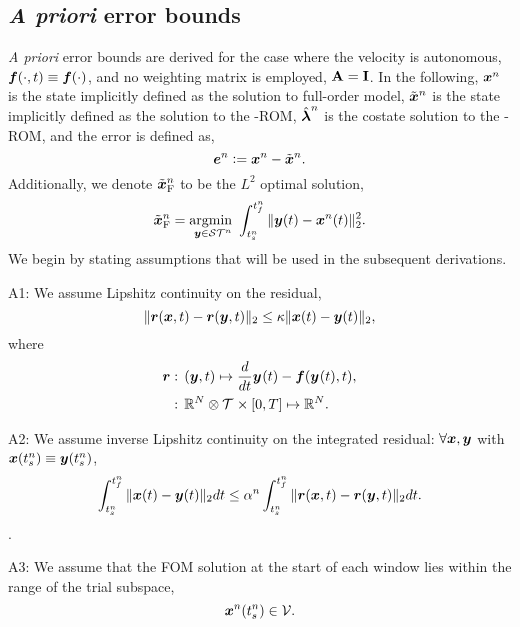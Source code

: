 \subsection{\textit{A priori} error bounds}
\textit{A priori} error bounds are derived for the case where the velocity is autonomous, $\boldsymbol f(\cdot,t) \equiv \boldsymbol f(\cdot)$, and no weighting matrix is employed, $\mathbf{A} = \mathbf{I}$. 
In the following,  ${\boldsymbol x}^{n}$ is the state implicitly defined as the solution to full-order model, $\tilde{\boldsymbol x}^{n}$ is the state implicitly defined as the solution to the \methodAcronym-ROM, $\hat{\boldsymbol \lambda}^{n}$ is the costate solution to the \methodAcronym-ROM, and the error is defined as,
$$\boldsymbol e^{n} \vcentcolon= {\boldsymbol x}^{n} - \tilde{\boldsymbol x}^{n}.$$
Additionally, we denote $\tilde{\boldsymbol x}_{\text{F}}^{n}$ to be the $L^2$ optimal solution,
$$\tilde{\boldsymbol x}_{\text{F}}^{n} = \underset{\boldsymbol y \in \mathcal{ ST }^n}{\text{argmin } } \int_{t_s^{n}}^{t_f^{n}} \|  \boldsymbol y(t) - {\boldsymbol x}^{n}(t)  \|_2^2.$$ 
We begin by stating assumptions that will be used in the subsequent derivations.

A1: We assume  Lipshitz continuity on the residual,
$$ \| \boldsymbol r(\boldsymbol x,t) - \boldsymbol r(\boldsymbol y,t)  \|_2 \le \kappa \| \boldsymbol x(t) - \boldsymbol y(t) \|_2,$$
where  
\begin{align*}
\boldsymbol r &: \, (\boldsymbol y,t) \mapsto \frac{d}{dt}\boldsymbol y^{}(t) - \boldsymbol f(\boldsymbol y^{}(t),t) ,\\
&: \, \mathbb{R}^{N} \otimes \mathcal{T}^{} \times [0,T] \mapsto \mathbb{R}^{N}.
\end{align*}

A2: We assume inverse Lipshitz continuity on the integrated residual: $\forall \boldsymbol x,\boldsymbol y$ with $\boldsymbol x(t_s^{n} ) \equiv \boldsymbol y(t_s^{n})$,
$$  \int_{t_s^{n}}^{t_f^{n}} \| \boldsymbol x(t) - \boldsymbol y(t) \|_2 dt \le  \alpha^{n} \int_{t_s^{n}}^{t_f^{n}} \| \boldsymbol r(\boldsymbol x,t) - \boldsymbol r(\boldsymbol y,t)  \|_2 dt.$$
.

A3: We assume that the FOM solution at the start of each window lies within the range of the trial subspace,
$$ {\boldsymbol x}^{n}(t_s^{n}) \in \mathcal{V }.$$ 
%

